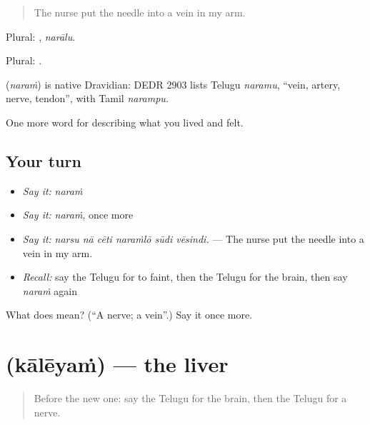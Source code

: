 \begin{quote}
The nurse put the needle into a vein in my arm.
\end{quote}

Plural: , \emph{narālu}.

Plural: .

\begin{cousinweb}
\textbf{} (\emph{naraṁ}) is native Dravidian: DEDR 2903 lists Telugu \emph{naramu}, \textquotedblleft{}vein, artery, nerve, tendon\textquotedblright{}, with Tamil \emph{narampu}.
\end{cousinweb}

\begin{grammarlens}[title={What you've built}]
One more word for describing what you lived and felt.
\end{grammarlens}

\subsection*{Your turn}
\begin{itemize}
\raggedright
  \item \emph{Say it:} \emph{naraṁ}
  \item \emph{Say it:} \emph{naraṁ}, once more
  \item \emph{Say it:} \emph{narsu nā cēti naraṁlō sūdi vēsindi.} — The nurse put the needle into a vein in my arm.
  \item \emph{Recall:} say the Telugu for to faint, then the Telugu for the brain, then say \emph{naraṁ} again
\end{itemize}

\begin{tcolorbox}[breakable,colback=teal!4,colframe=teal!35!black,title={Before you move on}]
What does  mean? (\textquotedblleft{}A nerve; a vein\textquotedblright{}.) Say it once more.
\end{tcolorbox}
\section[\texorpdfstring{\te{కాలేయం} (kālēyaṁ)}{కాలేయం (kālēyaṁ)}]{ (kālēyaṁ) — the liver}

\label{lesson:TE-C515-kaleyam}



\begin{quote}
Before the new one: say the Telugu for the brain, then the Telugu for a nerve.
\end{quote}

